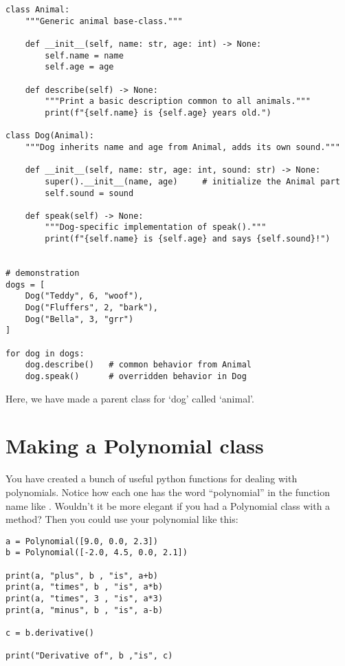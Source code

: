 \begin{verbatim}
class Animal:
    """Generic animal base-class."""

    def __init__(self, name: str, age: int) -> None:
        self.name = name
        self.age = age

    def describe(self) -> None:
        """Print a basic description common to all animals."""
        print(f"{self.name} is {self.age} years old.")

class Dog(Animal):
    """Dog inherits name and age from Animal, adds its own sound."""

    def __init__(self, name: str, age: int, sound: str) -> None:
        super().__init__(name, age)     # initialize the Animal part
        self.sound = sound

    def speak(self) -> None:
        """Dog-specific implementation of speak()."""
        print(f"{self.name} is {self.age} and says {self.sound}!")


# demonstration
dogs = [
    Dog("Teddy", 6, "woof"),
    Dog("Fluffers", 2, "bark"),
    Dog("Bella", 3, "grr")
]

for dog in dogs:
    dog.describe()   # common behavior from Animal
    dog.speak()      # overridden behavior in Dog

\end{verbatim}

Here, we have made a parent class for `dog' called `animal'. 
\section{Making a Polynomial class}

You have created a bunch of useful python functions for dealing with
polynomials. Notice how each one has the word ``polynomial'' in the
function name like .  Wouldn't it
be more elegant if you had a Polynomial class with a
 method? Then you could use your polynomial
like this:
\begin{Verbatim}
a = Polynomial([9.0, 0.0, 2.3])
b = Polynomial([-2.0, 4.5, 0.0, 2.1])

print(a, "plus", b , "is", a+b)
print(a, "times", b , "is", a*b)
print(a, "times", 3 , "is", a*3)
print(a, "minus", b , "is", a-b)

c = b.derivative()

print("Derivative of", b ,"is", c)
\end{Verbatim}

